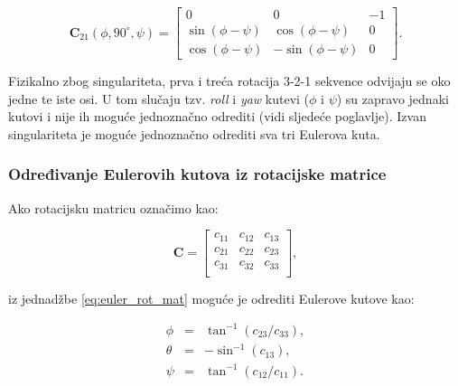 \documentclass[times, utf8, diplomski, numeric]{templates/template}
\begin{document}
{{{{                \begin{equation}
                \boldsymbol{C}_{21}(\phi, 90^{\circ}, \psi) =
                \begin{bmatrix}
                    0                 & 0                  & -1 \\
                    \sin(\phi - \psi) & \cos(\phi - \psi)  &  0 \\
                    \cos(\phi - \psi) & -\sin(\phi - \psi) &  0
                \end{bmatrix}
                .
                \end{equation}

                Fizikalno zbog singulariteta, prva i treća rotacija 3-2-1 sekvence odvijaju se oko jedne te iste osi. U tom slučaju tzv. \emph{roll} i \emph{yaw} kutevi ($\phi$ i $\psi$) su zapravo jednaki kutovi i nije ih moguće jednoznačno odrediti (vidi sljedeće poglavlje). Izvan singulariteta je moguće jednoznačno odrediti sva tri Eulerova kuta. 
            }

            \subsubsection{Određivanje Eulerovih kutova iz rotacijske matrice}{
                Ako rotacijsku matricu označimo kao:

                \begin{equation}
                \label{eq:rotation_matrix}
                \boldsymbol{C} =
                \begin{bmatrix}
                    c_{11} & c_{12} & c_{13} \\
                    c_{21} & c_{22} & c_{23} \\
                    c_{31} & c_{32} & c_{33} \\
                \end{bmatrix}
                ,
                \end{equation}

                iz jednadžbe \ref{eq:euler_rot_mat} moguće je odrediti Eulerove kutove kao:

                \begin{equation}
                \begin{array}{rcl}
                    \phi   & = & \tan^{-1}(c_{23}/c_{33}),\\
                    \theta & = & -\sin^{-1}(c_{13}),\\
                    \psi   & = & \tan^{-1}(c_{12}/c_{11}).
                \end{array}
                \end{equation}
            }

}}}
\end{document}
